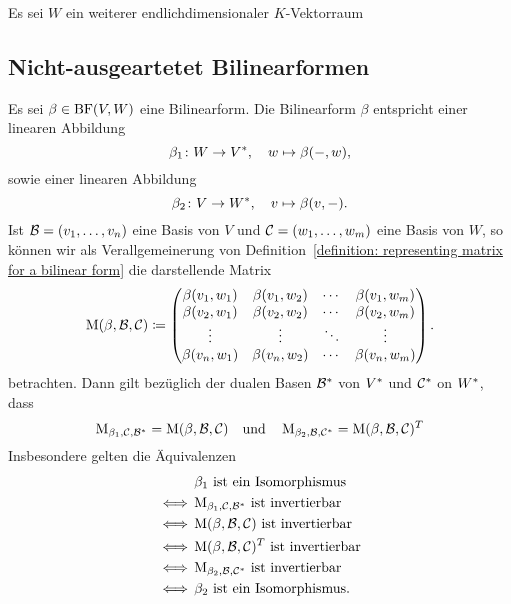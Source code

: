 Es sei $W$ ein weiterer endlichdimensionaler $K$-Vektorraum



\subsection{Nicht-ausgeartetet Bilinearformen}

Es sei $\beta \in \operatorname{BF}(V, W)$ eine Bilinearform.
Die Bilinearform $\beta$ entspricht einer linearen Abbildung
\[
          \beta_1
  \colon  W
  \to     V^*,
  \quad
          w
  \mapsto \beta(-,w),
\]
sowie einer linearen Abbildung
\[
          \beta_2
  \colon  V
  \to     W^*,
  \quad
          v
  \mapsto \beta(v,-).
\]
Ist $\mathcal{B} = (v_1, \dotsc, v_n)$ eine Basis von $V$ und $\mathcal{C} = (w_1, \dotsc, w_m)$ eine Basis von $W$, so können wir als Verallgemeinerung von Definition~\ref{definition: representing matrix for a bilinear form} die darstellende Matrix
\[
            \operatorname{M}(\beta, \mathcal{B}, \mathcal{C})
  \coloneqq \begin{pmatrix}
              \beta(v_1, w_1) & \beta(v_1, w_2) & \cdots  & \beta(v_1, w_m) \\
              \beta(v_2, w_1) & \beta(v_2, w_2) & \cdots  & \beta(v_2, w_m) \\
              \vdots          & \vdots          & \ddots  & \vdots          \\
              \beta(v_n, w_1) & \beta(v_n, w_2) & \cdots  & \beta(v_n, w_m)
            \end{pmatrix}.
\]
betrachten.
Dann gilt bezüglich der dualen Basen $\mathcal{B}^*$ von $V^*$ und $\mathcal{C}^*$ on $W^*$, dass
\[
    \operatorname{M}_{\beta_1, \mathcal{C}, \mathcal{B}^*}
  = \operatorname{M}(\beta, \mathcal{B}, \mathcal{C})
  \quad\text{und}\quad
    \operatorname{M}_{\beta_2, \mathcal{B}, \mathcal{C}^*}
  = \operatorname{M}(\beta, \mathcal{B}, \mathcal{C}) ^T
\]
Insbesondere gelten die Äquivalenzen
\begin{align*}
      &\, \text{$\beta_1$ ist ein Isomorphismus}                                                \\
  \iff&\, \text{$\operatorname{M}_{\beta_1, \mathcal{C}, \mathcal{B}^*}$ ist invertierbar}         \\
  \iff&\, \text{$\operatorname{M}(\beta, \mathcal{B}, \mathcal{C})$ ist invertierbar}               \\
  \iff&\, \text{$\operatorname{M}(\beta, \mathcal{B}, \mathcal{C}) ^T$ ist invertierbar} \\
  \iff&\, \text{$\operatorname{M}_{\beta_2, \mathcal{B}, \mathcal{C}^*}$ ist invertierbar}         \\
  \iff&\, \text{$\beta_2$ ist ein Isomorphismus}.
\end{align*}

